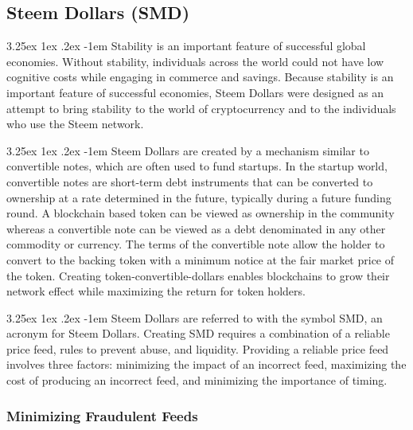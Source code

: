 \documentclass{article}
\makeatletter
\renewcommand\paragraph{\@startsection{paragraph}{5}{\z@}%
  {3.25ex \@plus1ex \@minus.2ex}%
  {-1em}%
  {\normalfont\normalsize\bfseries}}
\makeatother
\begin{document}
		\subsection{Steem Dollars (SMD)}

			\paragraph{}
				Stability is an important feature of successful global economies. Without stability, individuals across the world could not have low cognitive costs while engaging in commerce and savings. Because stability is an important feature of successful economies, Steem Dollars were designed as an attempt to bring stability to the world of cryptocurrency and to the individuals who use the Steem network.

			\paragraph{}
				Steem Dollars are created by a mechanism similar to convertible notes, which are often used to fund startups. In the startup world, convertible notes are short-term debt instruments that can be converted to ownership at a rate determined in the future, typically during a future funding round. A blockchain based token can be viewed as ownership in the community whereas a convertible note can be viewed as a debt denominated in any other commodity or currency. The terms of the convertible note allow the holder to convert to the backing token with a minimum notice at the fair market price of the token. Creating token-convertible-dollars enables blockchains to grow their network effect while maximizing the return for token holders.

			\paragraph{}
				Steem Dollars are referred to with the symbol SMD, an acronym for Steem Dollars. Creating SMD requires a combination of a reliable price feed, rules to prevent abuse, and liquidity. Providing a reliable price feed involves three factors: minimizing the impact of an incorrect feed, maximizing the cost of producing an incorrect feed, and minimizing the importance of timing.

			\subsubsection{Minimizing Fraudulent Feeds}
\end{document}
